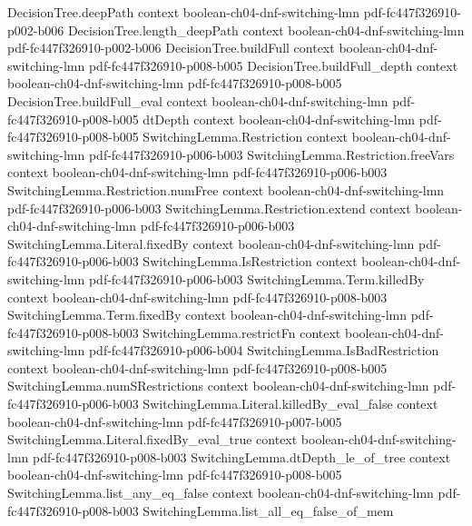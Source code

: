 \begin{theorem}
\proofstep
  {DecisionTree.deepPath}
  {context}
  {boolean-ch04-dnf-switching-lmn}
  {pdf-fc447f326910-p002-b006}
\proofstep
  {DecisionTree.length_deepPath}
  {context}
  {boolean-ch04-dnf-switching-lmn}
  {pdf-fc447f326910-p002-b006}
\proofstep
  {DecisionTree.buildFull}
  {context}
  {boolean-ch04-dnf-switching-lmn}
  {pdf-fc447f326910-p008-b005}
\proofstep
  {DecisionTree.buildFull_depth}
  {context}
  {boolean-ch04-dnf-switching-lmn}
  {pdf-fc447f326910-p008-b005}
\proofstep
  {DecisionTree.buildFull_eval}
  {context}
  {boolean-ch04-dnf-switching-lmn}
  {pdf-fc447f326910-p008-b005}
\proofstep
  {dtDepth}
  {context}
  {boolean-ch04-dnf-switching-lmn}
  {pdf-fc447f326910-p008-b005}
\proofstep
  {SwitchingLemma.Restriction}
  {context}
  {boolean-ch04-dnf-switching-lmn}
  {pdf-fc447f326910-p006-b003}
\proofstep
  {SwitchingLemma.Restriction.freeVars}
  {context}
  {boolean-ch04-dnf-switching-lmn}
  {pdf-fc447f326910-p006-b003}
\proofstep
  {SwitchingLemma.Restriction.numFree}
  {context}
  {boolean-ch04-dnf-switching-lmn}
  {pdf-fc447f326910-p006-b003}
\proofstep
  {SwitchingLemma.Restriction.extend}
  {context}
  {boolean-ch04-dnf-switching-lmn}
  {pdf-fc447f326910-p006-b003}
\proofstep
  {SwitchingLemma.Literal.fixedBy}
  {context}
  {boolean-ch04-dnf-switching-lmn}
  {pdf-fc447f326910-p006-b003}
\proofstep
  {SwitchingLemma.IsRestriction}
  {context}
  {boolean-ch04-dnf-switching-lmn}
  {pdf-fc447f326910-p006-b003}
\proofstep
  {SwitchingLemma.Term.killedBy}
  {context}
  {boolean-ch04-dnf-switching-lmn}
  {pdf-fc447f326910-p008-b003}
\proofstep
  {SwitchingLemma.Term.fixedBy}
  {context}
  {boolean-ch04-dnf-switching-lmn}
  {pdf-fc447f326910-p008-b003}
\proofstep
  {SwitchingLemma.restrictFn}
  {context}
  {boolean-ch04-dnf-switching-lmn}
  {pdf-fc447f326910-p006-b004}
\proofstep
  {SwitchingLemma.IsBadRestriction}
  {context}
  {boolean-ch04-dnf-switching-lmn}
  {pdf-fc447f326910-p008-b005}
\proofstep
  {SwitchingLemma.numSRestrictions}
  {context}
  {boolean-ch04-dnf-switching-lmn}
  {pdf-fc447f326910-p006-b003}
\proofstep
  {SwitchingLemma.Literal.killedBy_eval_false}
  {context}
  {boolean-ch04-dnf-switching-lmn}
  {pdf-fc447f326910-p007-b005}
\proofstep
  {SwitchingLemma.Literal.fixedBy_eval_true}
  {context}
  {boolean-ch04-dnf-switching-lmn}
  {pdf-fc447f326910-p008-b003}
\proofstep
  {SwitchingLemma.dtDepth_le_of_tree}
  {context}
  {boolean-ch04-dnf-switching-lmn}
  {pdf-fc447f326910-p008-b005}
\proofstep
  {SwitchingLemma.list_any_eq_false}
  {context}
  {boolean-ch04-dnf-switching-lmn}
  {pdf-fc447f326910-p008-b003}
\proofstep
  {SwitchingLemma.list_all_eq_false_of_mem}

\end{theorem}
